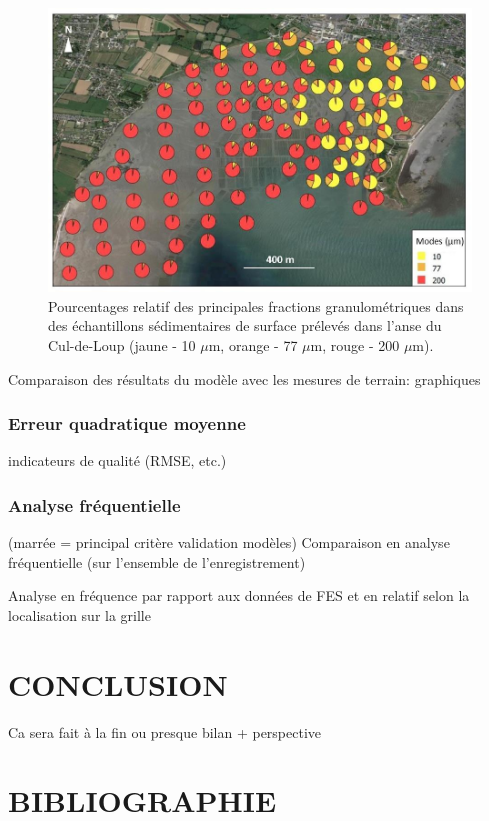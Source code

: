 \documentclass[10pt,a4paper,titlepage]{article}
\begin{document}
\begin{figure}[!h]
    \centering
    \includegraphics[width=0.8\linewidth]{../images/sed_adcl_protec.png}
    \caption[Sédiment de l'anse du Cul-de-Loup]{Pourcentages relatif des principales fractions granulométriques dans des échantillons sédimentaires de surface prélevés dans l'anse du Cul-de-Loup (jaune - 10 $\mu$m, orange - 77 $\mu$m, rouge - 200 $\mu$m).}
    \label{fig:sed-adcl}
\end{figure}



Comparaison des résultats du modèle avec les mesures de terrain: graphiques

\subsubsection{Erreur quadratique moyenne}
indicateurs de qualité (RMSE, etc.)

\subsubsection{Analyse fréquentielle}
(marrée = principal critère validation modèles)
Comparaison en analyse fréquentielle (sur l'ensemble de l'enregistrement)

Analyse en fréquence par rapport aux données de FES et en relatif selon la localisation sur la grille

\newpage

\section{CONCLUSION}
\label{sec:conclusion}

Ca sera fait à la fin ou presque
bilan + perspective

\newpage
\section{BIBLIOGRAPHIE}
\printbibliography
\end{document}

